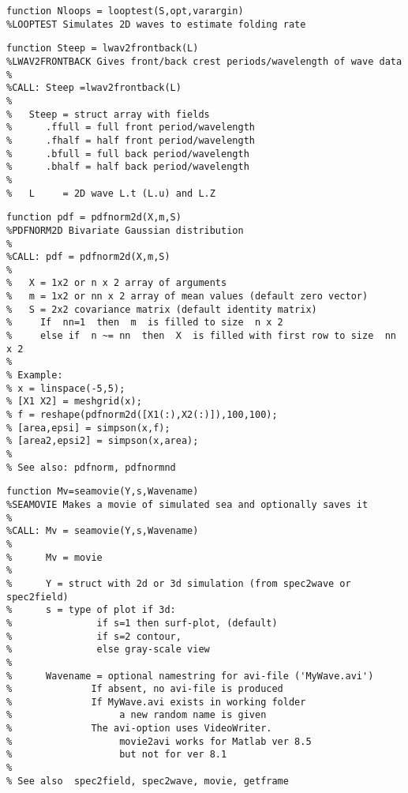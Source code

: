 {\begin{verbatim}
function Nloops = looptest(S,opt,varargin)
%LOOPTEST Simulates 2D waves to estimate folding rate
\end{verbatim}
\clearpage

\begin{verbatim}
function Steep = lwav2frontback(L)
%LWAV2FRONTBACK Gives front/back crest periods/wavelength of wave data
%
%CALL: Steep =lwav2frontback(L)
%
%   Steep = struct array with fields
%      .ffull = full front period/wavelength
%      .fhalf = half front period/wavelength
%      .bfull = full back period/wavelength
%      .bhalf = half back period/wavelength
%
%   L     = 2D wave L.t (L.u) and L.Z
\end{verbatim}
\clearpage

\begin{verbatim}
function pdf = pdfnorm2d(X,m,S)
%PDFNORM2D Bivariate Gaussian distribution  
%
%CALL: pdf = pdfnorm2d(X,m,S)
%
%   X = 1x2 or n x 2 array of arguments
%   m = 1x2 or nn x 2 array of mean values (default zero vector)
%   S = 2x2 covariance matrix (default identity matrix)
%     If  nn=1  then  m  is filled to size  n x 2
%     else if  n ~= nn  then  X  is filled with first row to size  nn x 2
%
% Example:
% x = linspace(-5,5);
% [X1 X2] = meshgrid(x);
% f = reshape(pdfnorm2d([X1(:),X2(:)]),100,100);
% [area,epsi] = simpson(x,f);
% [area2,epsi2] = simpson(x,area);
%
% See also: pdfnorm, pdfnormnd
\end{verbatim}
\clearpage

\begin{verbatim}
function Mv=seamovie(Y,s,Wavename)
%SEAMOVIE Makes a movie of simulated sea and optionally saves it
%  
%CALL: Mv = seamovie(Y,s,Wavename)
%  
%      Mv = movie
%
%      Y = struct with 2d or 3d simulation (from spec2wave or spec2field)
%      s = type of plot if 3d: 
%               if s=1 then surf-plot, (default)
%               if s=2 contour,
%               else gray-scale view 
%
%      Wavename = optional namestring for avi-file ('MyWave.avi') 
%              If absent, no avi-file is produced
%              If MyWave.avi exists in working folder 
%                   a new random name is given
%              The avi-option uses VideoWriter. 
%                   movie2avi works for Matlab ver 8.5 
%                   but not for ver 8.1
%  
% See also  spec2field, spec2wave, movie, getframe
\end{verbatim}
\clearpage

}
